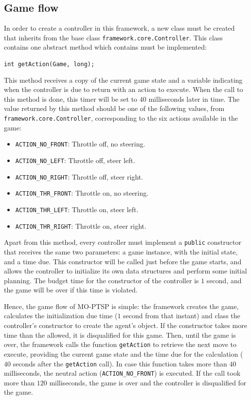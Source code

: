 \documentclass[conference]{IEEEtran}
\newcommand{\code}[1]{{\lstinline!#1!}}
\begin{document}
\subsection{Game flow}

In order to create a controller in this framework, a new class must be created that inherits from the base class \code{framework.core.Controller}. This class contains one abstract method which contains must be implemented: 

\begin{center}
\code{int getAction(Game, long);}
\end{center}

This method receives a copy of the current game state and a variable indicating when the controller is due to return with an action to execute. When the call to this method is done, this timer will be set to $40$ milliseconds later in time. The value returned by this method should be one of the following values, from \code{framework.core.Controller}, corresponding to the six actions available in the game:

\begin{itemize}
\item \code{ACTION_NO_FRONT}: Throttle off, no steering.
\item \code{ACTION_NO_LEFT}: Throttle off, steer left.
\item \code{ACTION_NO_RIGHT}: Throttle off, steer right.
\item \code{ACTION_THR_FRONT}: Throttle on, no steering. 
\item \code{ACTION_THR_LEFT}: Throttle on, steer left. 
\item \code{ACTION_THR_RIGHT}: Throttle on, steer right.
\end{itemize}

Apart from this method, every controller must implement a \code{public} constructor that receives the same two parameters: a game instance, with the initial state, and a time due. This constructor will be called just before the game starts, and allows the controller to initialize its own data structures and perform some initial planning. The budget time for the constructor of the controller is $1$ second, and the game will be over if this time is violated.

Hence, the game flow of MO-PTSP is simple: the framework creates the game, calculates the initialization due time ($1$ second from that instant) and class the controller's constructor to create the agent's object. If the constructor takes more time than the allowed, it is disqualified for this game. Then, until the game is over, the framework calls the function \code{getAction} to retrieve the next move to execute, providing the current game state and the time due for the calculation ($40$ seconds after the \code{getAction} call). In case this function takes more than $40$ milliseconds, the neutral action (\code{ACTION_NO_FRONT}) is executed. If the call took more than $120$ milliseconds, the game is over and the controller is disqualified for the game.
\end{document}
